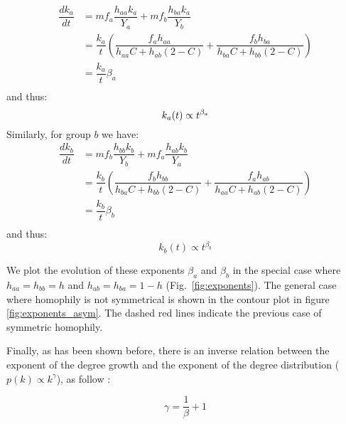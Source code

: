 \begin{equation}\label{eq:ca}
\begin{split}
  \dfrac{dk_a}{dt} &= mf_a\dfrac{h_{aa}k_a}{Y_a} + mf_b\dfrac{h_{ba}k_a}{Y_b}\\
  &= \dfrac{k_a}{t}\left(\dfrac{f_ah_{aa}}{h_{aa}C + h_{ab}(2-C)} + \dfrac{f_bh_{ba}}{h_{ba}C + h_{bb}(2-C)}\right)\\
  &= \dfrac{k_a}{t}\beta_a\\
\end{split}
\end{equation}
and thus:
\begin{equation}
  k_a(t) \propto t^{\beta_a}\\
\end{equation}
Similarly, for group $b$ we have:
\begin{equation}\label{eq:cb}
\begin{split}
  \dfrac{dk_b}{dt} &= mf_b\dfrac{h_{bb}k_b}{Y_b} + mf_a\dfrac{h_{ab}k_b}{Y_a}\\
  &= \dfrac{k_b}{t}\left(\dfrac{f_bh_{bb}}{h_{ba}C + h_{bb}(2-C)} + \dfrac{f_ah_{ab}}{h_{aa}C + h_{ab}(2-C)}\right)\\
  &= \dfrac{k_b}{t}\beta_b\\
\end{split}
\end{equation}
and thus:
\begin{equation}
  k_b(t) \propto t^{\beta_b}
\end{equation}

We plot the evolution of these exponents $\beta_a$ and $\beta_b$ in the special case where $h_{aa} = h_{bb} = h$ and $h_{ab} = h_{ba} = 1-h$ (Fig.~\ref{fig:exponents}). The general case where homophily is not symmetrical is shown in the contour plot in figure \ref{fig:exponents_asym}. The dashed red lines indicate the previous case of symmetric homophily.  






Finally, as has been shown before, there is an inverse relation between the exponent of the degree growth and the exponent of the degree distribution ($p(k) \propto k^\gamma$), as follow \cite{Barabasi99,bianconi2001competition} :

\begin{equation}
\label{eq:degree_exponent_SI}
    \gamma =\frac{1}{\beta} + 1
\end{equation}

